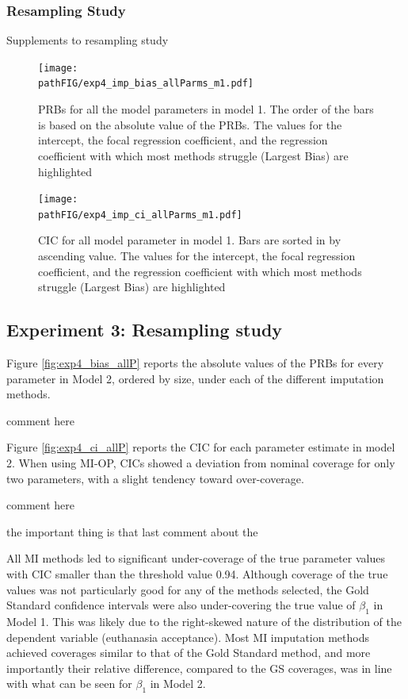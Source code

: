 \documentclass[11pt]{article}
\newcommand{\pathFIG}{../../output/graphs}
\begin{document}
\FloatBarrier

\subsubsection{Resampling Study}

Supplements to resampling study

\begin{figure}
	\centering
	\texttt{[image: \\pathFIG/exp4\_imp\_bias\_allParms\_m1.pdf]}
	\caption{PRBs for all the model parameters in model 1. 
		The order of the bars is based on the absolute value of the PRBs.
		The values for the intercept, the focal regression coefficient, and the regression coefficient with which most 
		methods struggle (Largest Bias) are highlighted}
	\label{fig:exp4bias_m1}
\end{figure}

\begin{figure}
	\centering
	\texttt{[image: \\pathFIG/exp4\_imp\_ci\_allParms\_m1.pdf]}
	\caption{CIC for all model parameter in model 1.
		Bars are sorted in by ascending value.
		The values for the intercept, the focal regression coefficient, and the regression coefficient with which most 
		methods struggle (Largest Bias) are highlighted}
	\label{fig:exp4cir_m1}
\end{figure}

\FloatBarrier

\subsection{Experiment 3: Resampling study}

	Figure \ref{fig:exp4_bias_allP} reports the absolute values of the PRBs for every parameter in Model 2, 
	ordered by size, under each of the different imputation methods.

	comment here

	Figure \ref{fig:exp4_ci_allP} reports the CIC for each parameter estimate in model 2.
	When using MI-OP, CICs showed a deviation from nominal coverage for only two parameters, with a slight 
	tendency toward over-coverage.

	comment here

	the important thing is that last comment about the 

	All MI methods led to significant under-coverage of the true parameter values with CIC smaller than the 
	threshold value 0.94.
	Although coverage of the true values was not particularly good for any of the methods selected, the Gold Standard
	confidence intervals were also under-covering the true value of $\beta_{1}$ in Model 1.
	This was likely due to the right-skewed nature of the distribution of the dependent variable (euthanasia 
	acceptance).
	Most MI imputation methods achieved coverages similar to that of the Gold Standard method, and more importantly 
	their relative difference, compared to the GS coverages, was in line with what can be seen for $\beta_{1}$ in Model 2.
\end{document}
